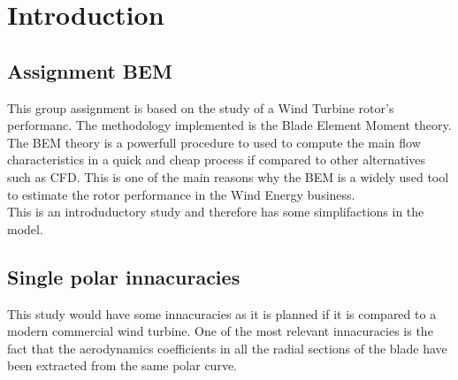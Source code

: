 \chapter{Introduction}

\section{Assignment BEM }

This group assignment is based on the study of a Wind Turbine rotor's performanc. The methodology implemented is the Blade Element Moment theory. The BEM theory is a powerfull procedure to used to compute the main flow characteristics in a quick and cheap process if compared to other alternatives such as CFD. This is one of the main reasons why the BEM is a widely used tool to estimate the rotor performance in the Wind Energy business. \\

This is an introduductory study and therefore has some simplifactions in the model.  

\section{Single polar innacuracies}

This study would have some innacuracies as it is planned if it is compared to a modern commercial wind turbine. One of the most relevant innacuracies is the fact that the aerodynamics coefficients in all the radial sections of the blade have been extracted from the same polar curve. \\

